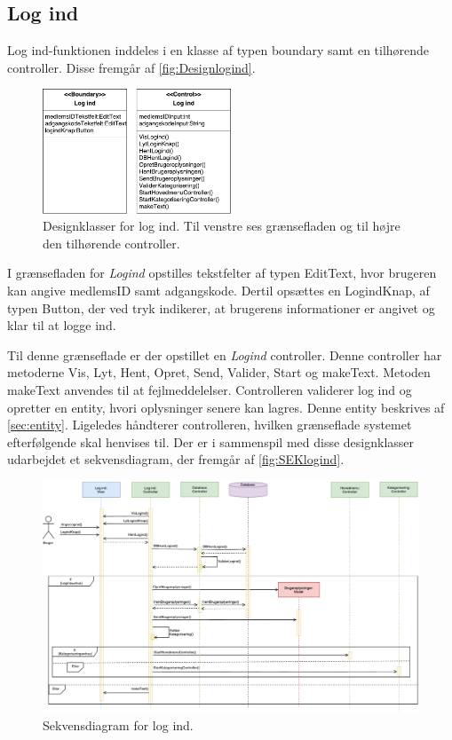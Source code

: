 \subsection*{Log ind}
Log ind-funktionen inddeles i en klasse af typen boundary samt en tilhørende controller. Disse fremgår af \autoref{fig:Designlogind}. 

\begin{figure} [H]
\centering
\includegraphics[width=0.5\textwidth]{figures/MVC/MVCLogInd}
\caption{Designklasser for log ind. Til venstre ses grænsefladen og til højre den tilhørende controller.}
\label{fig:Designlogind}
\end{figure}

\noindent
I grænsefladen for \textit{Logind} opstilles tekstfelter af typen EditText, hvor brugeren kan angive medlemsID samt adgangskode. Dertil opsættes en LogindKnap, af typen Button, der ved tryk indikerer, at brugerens informationer er angivet og klar til at logge ind. 

Til denne grænseflade er der opstillet en \textit{Logind} controller. Denne controller har metoderne Vis, Lyt, Hent, Opret, Send, Valider, Start og makeText. Metoden makeText anvendes til at fejlmeddelelser. Controlleren validerer log ind og opretter en entity, hvori oplysninger senere kan lagres. Denne entity beskrives af \autoref{sec:entity}. Ligeledes håndterer controlleren, hvilken grænseflade systemet efterfølgende skal henvises til. Der er i sammenspil med disse designklasser udarbejdet et sekvensdiagram, der fremgår af \autoref{fig:SEKlogind}.

\begin{figure} [H]
\centering
\includegraphics[width=1.55\textwidth, angle=90]{figures/Sek/SEKLogInd}
\caption{Sekvensdiagram for log ind.}
\label{fig:SEKlogind}
\end{figure}

